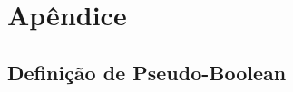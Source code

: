 \documentclass[conference]{IEEEtran}
\begin{document}
\newpage

\section{Apêndice}

\subsection{Definição de Pseudo-Boolean}







\end{document}
